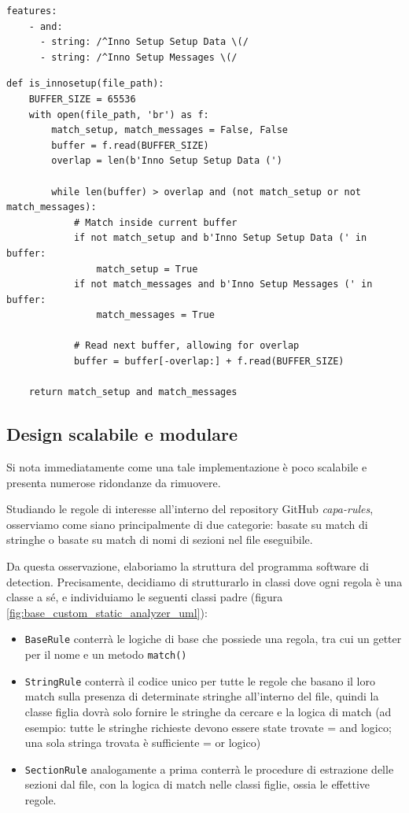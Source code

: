 \begin{minipage}{\textwidth}
\begin{verbatim}
features:
    - and:
      - string: /^Inno Setup Setup Data \(/
      - string: /^Inno Setup Messages \(/
\end{verbatim}

\begin{verbatim}
def is_innosetup(file_path):
    BUFFER_SIZE = 65536
    with open(file_path, 'br') as f:
        match_setup, match_messages = False, False
        buffer = f.read(BUFFER_SIZE)
        overlap = len(b'Inno Setup Setup Data (')

        while len(buffer) > overlap and (not match_setup or not match_messages):
            # Match inside current buffer
            if not match_setup and b'Inno Setup Setup Data (' in buffer:
                match_setup = True
            if not match_messages and b'Inno Setup Messages (' in buffer:
                match_messages = True
            
            # Read next buffer, allowing for overlap
            buffer = buffer[-overlap:] + f.read(BUFFER_SIZE)
    
    return match_setup and match_messages
\end{verbatim}
\end{minipage}

\subsection{Design scalabile e modulare}
Si nota immediatamente come una tale implementazione è poco scalabile e presenta numerose ridondanze da rimuovere.

Studiando le regole di interesse all'interno del repository GitHub \textit{capa-rules}, osserviamo come siano principalmente di due categorie: basate su match di stringhe o basate su match di nomi di sezioni nel file eseguibile.

Da questa osservazione, elaboriamo la struttura del programma software di detection. Precisamente, decidiamo di strutturarlo in classi dove ogni regola è una classe a sé, e individuiamo le seguenti classi padre (figura \ref{fig:base_custom_static_analyzer_uml}):
\begin{itemize}
    \item \texttt{BaseRule} conterrà le logiche di base che possiede una regola, tra cui un getter per il nome e un metodo \texttt{match()}
    \item \texttt{StringRule} conterrà il codice unico per tutte le regole che basano il loro match sulla presenza di determinate stringhe all'interno del file, quindi la classe figlia dovrà solo fornire le stringhe da cercare e la logica di match (ad esempio: tutte le stringhe richieste devono essere state trovate = and logico; una sola stringa trovata è sufficiente = or logico)
    \item \texttt{SectionRule} analogamente a prima conterrà le procedure di estrazione delle sezioni dal file, con la logica di match nelle classi figlie, ossia le effettive regole.
\end{itemize}

